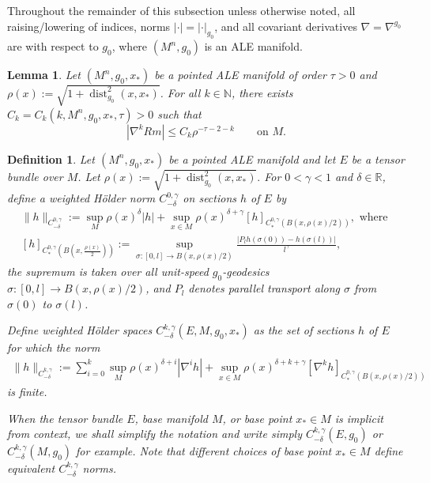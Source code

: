 \documentclass[12pt]{amsart}
\renewcommand{\1}{{\mathbf 1}}
\newcommand{\R}{{\mathbb R}}
\newcommand{\dist}{{\operatorname{dist}}}
\newtheorem{lemma}[thm]{Lemma}
\theoremstyle{others}
\newtheorem{defn}[thm]{Definition}
\numberwithin{equation}{section}
\begin{document}
Throughout the remainder of this subsection unless otherwise noted, all raising/lowering of indices, norms $| \cdot | = |\cdot |_{g_0}$, and all covariant derivatives $\nabla = \nabla^{g_0}$ are with respect to $g_0$, where $(M^n, g_0)$ is an ALE manifold.

\begin{lemma} \label{lemma: Rm est for ALE}
    Let $(M^n, g_0, x_*)$ be a pointed ALE manifold of order $\tau > 0$ and $\rho(x) := \sqrt{1 + \dist_{g_0}^2(x, x_*)}$.
    For all $k \in \mathbb N$, there exists $C_k = C_k(k, M^n, g_0, x_*, \tau) >0 $ such that 
        $$|\nabla^k Rm | \le C_k \rho^{-\tau -2-k} \qquad \text{on } M.$$
\end{lemma}

\begin{defn} \label{defn weighted Holder}
    Let $(M^n, g_0, x_*)$ be a pointed ALE manifold and let $E$ be a tensor bundle over $M$.
    Let $\rho(x) := \sqrt{1 + \dist_{g_0}^2(x, x_*)}.$ 
    For $0 < \gamma < 1$ and $\delta \in \R$, define a weighted H{\"o}lder norm $C^{0, \gamma}_{-\delta}$ on sections $h$ of $E$ by 
\begin{equation} \label{eqn defn weighted Holder norm}
\begin{split}
    \| h \|_{C^{0 , \gamma}_{-\delta} } := \sup_M \rho(x)^{\delta} | h | + \sup_{x\in M} \rho(x)^{\delta + \gamma} [h ]_{C^{0, \gamma}_* (B(x, \rho(x)/2))}, \text{ where }\\
 [h ]_{C^{0, \gamma}_*(B(x, \frac{\rho(x)}2))} :=  \sup_{\sigma:[0, l] \to B(x, \rho(x)/2)} \frac{|P_l h(\sigma(0)) - h(\sigma(l)) |}{l^\gamma},
    \end{split}
\end{equation}
the supremum is taken over all unit-speed $g_0$-geodesics $\sigma :[0, l] \to B(x, \rho(x)/2)$, and $P_l$ denotes parallel transport along $\sigma$ from $\sigma(0)$ to $\sigma(l)$.

Define weighted H{\"o}lder spaces $C^{k, \gamma}_{-\delta}(E, M, g_0, x_*)$ as the set of sections $h$ of $E$ for which the norm
\begin{gather} \label{eqn defn weighted Holder norm, higher order}
    \| h \|_{C^{k , \gamma}_{-\delta} } := \sum_{i=0}^k \sup_M \rho(x)^{\delta +i} |\nabla^i h | + \sup_{x\in M} \rho(x)^{\delta + k + \gamma} [ \nabla^{k} h ]_{C^{0, \gamma}_* (B(x, \rho(x)/2))}
\end{gather}
is finite.

When the tensor bundle $E$, base manifold $M$, or base point $x_* \in M$ is implicit from context, we shall simplify the notation and write simply $C^{k, \gamma}_{-\delta} (E, g_0)$ or $C^{k, \gamma}_{-\delta} (M, g_0)$ for example.
Note that different choices of base point $x_* \in M$ define equivalent $C^{k,\gamma}_{-\delta}$ norms.
\end{defn}
\end{document}
